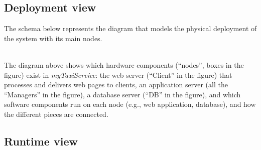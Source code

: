 \documentclass[a4paper,11pt]{report} %
\newcommand{\mts}{\mbox{\normalfont\itshape myTaxiService}}
\begin{document}
	\pagebreak
	\subsection{Deployment view}
	The schema below represents the diagram that models the physical deployment of the system with its main nodes.\\
	\begin{minipage}{\linewidth}
	\end{minipage} \\

	\vspace*{+0.35cm}
	The diagram above shows which hardware components (``nodes'', boxes in the figure) exist in \mts{}:  the web server (``Client'' in the figure) that processes and delivers web pages to clients, an application server (all the ``Managers'' in the figure), a database server (``DB'' in the figure), and which software components run on each node (e.g., web application, database), and how the different pieces are connected.
	
	\pagebreak
	\subsection{Runtime view}
\end{document}
